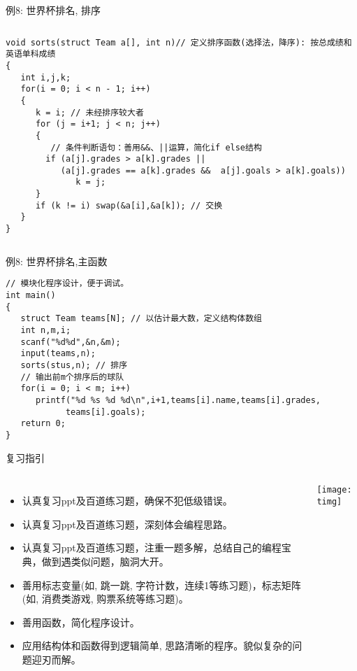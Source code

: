 \begin{frame}{例8: 世界杯排名, 排序}
\vspace{-0.5cm}
\begin{columns}[T]
\begin{lstlisting}
void sorts(struct Team a[], int n)// 定义排序函数(选择法，降序): 按总成绩和英语单科成绩 
{
   int i,j,k;
   for(i = 0; i < n - 1; i++)
   {
      k = i; // 未经排序较大者
      for (j = i+1; j < n; j++)
      {
         // 条件判断语句：善用&&、||运算，简化if else结构 
        if (a[j].grades > a[k].grades || 
           (a[j].grades == a[k].grades &&  a[j].goals > a[k].goals))  
              k = j;
      }
      if (k != i) swap(&a[i],&a[k]); // 交换
   } 
}
\end{lstlisting}
\end{columns}
\medskip
\end{frame}

\begin{frame}{例8: 世界杯排名,主函数}
\vspace{-0.4cm}
\begin{lstlisting}
// 模块化程序设计，便于调试。
int main()
{
   struct Team teams[N]; // 以估计最大数，定义结构体数组 
   int n,m,i;
   scanf("%d%d",&n,&m);
   input(teams,n); 
   sorts(stus,n); // 排序
   // 输出前m个排序后的球队 
   for(i = 0; i < m; i++)
      printf("%d %s %d %d\n",i+1,teams[i].name,teams[i].grades,
      		teams[i].goals);
   return 0;
}
\end{lstlisting}
\end{frame}

\begin{frame}{复习指引}
\vspace{-0.2cm}
\begin{columns}
	\begin{itemize}
		\item 认真复习ppt及百道练习题，确保不犯低级错误。
		\item 认真复习ppt及百道练习题，深刻体会编程思路。
		\item 认真复习ppt及百道练习题，注重一题多解，总结自己的编程宝典，做到遇类似问题，脑洞大开。
		\item 善用标志变量(如, 跳一跳, 字符计数，连续1等练习题)，标志矩阵(如, 消费类游戏, 购票系统等练习题)。
		\item 善用函数，简化程序设计。
		\item 应用结构体和函数得到逻辑简单, 思路清晰的程序。貌似复杂的问题迎刃而解。 
	\end{itemize}
	\centering\texttt{[image: timg]}
\end{columns}
\end{frame}

